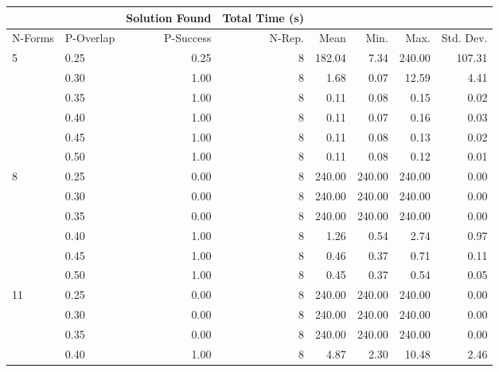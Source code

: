 \documentclass[11pt]{article}
\begin{document}
\begin{table}
  \begin{tabular}{llrrrrrr}
    \toprule[1.5pt]
    &      & Solution Found & Total Time (s) &        &        &        &           \\
    \midrule
    N-Forms &P-Overlap  &       P-Success &              N-Rep. &   Mean &   Min. &   Max. & Std. Dev. \\
    \midrule
    5  & 0.25 &           0.25 &              8 & 182.04 &   7.34 & 240.00 &    107.31 \\
    & 0.30 &           1.00 &              8 &   1.68 &   0.07 &  12.59 &      4.41 \\
    & 0.35 &           1.00 &              8 &   0.11 &   0.08 &   0.15 &      0.02 \\
    & 0.40 &           1.00 &              8 &   0.11 &   0.07 &   0.16 &      0.03 \\
    & 0.45 &           1.00 &              8 &   0.11 &   0.08 &   0.13 &      0.02 \\
    & 0.50 &           1.00 &              8 &   0.11 &   0.08 &   0.12 &      0.01 \\
    \midrule
    8  & 0.25 &           0.00 &              8 & 240.00 & 240.00 & 240.00 &      0.00 \\
    & 0.30 &           0.00 &              8 & 240.00 & 240.00 & 240.00 &      0.00 \\
    & 0.35 &           0.00 &              8 & 240.00 & 240.00 & 240.00 &      0.00 \\
    & 0.40 &           1.00 &              8 &   1.26 &   0.54 &   2.74 &      0.97 \\
    & 0.45 &           1.00 &              8 &   0.46 &   0.37 &   0.71 &      0.11 \\
    & 0.50 &           1.00 &              8 &   0.45 &   0.37 &   0.54 &      0.05 \\
    \midrule
    11 & 0.25 &           0.00 &              8 & 240.00 & 240.00 & 240.00 &      0.00 \\
    & 0.30 &           0.00 &              8 & 240.00 & 240.00 & 240.00 &      0.00 \\
    & 0.35 &           0.00 &              8 & 240.00 & 240.00 & 240.00 &      0.00 \\
    & 0.40 &           1.00 &              8 &   4.87 &   2.30 &  10.48 &      2.46 \\

\end{tabular}
\end{table}
\end{document}

